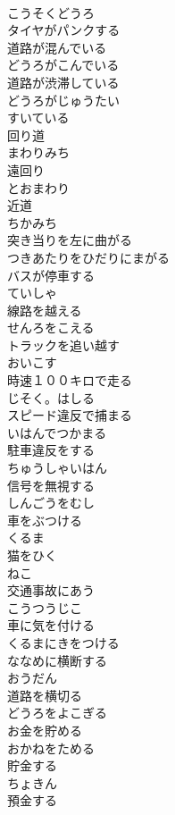 \documentclass[8pt]{extreport}
\begin{document}
\begin{CJK}{UTF8}{min}
\\	こうそくどうろ
\\	タイヤがパンクする	
\\	道路が混んでいる	
\\	どうろがこんでいる
\\	道路が渋滞している	
\\	どうろがじゅうたい
\\	すいている	
\\	回り道	
\\	まわりみち
\\	遠回り	
\\	とおまわり
\\	近道	
\\	ちかみち
\\	突き当りを左に曲がる	
\\	つきあたりをひだりにまがる
\\	バスが停車する	
\\	ていしゃ
\\	線路を越える	
\\	せんろをこえる
\\	トラックを追い越す	
\\	おいこす
\\	時速１００キロで走る	
\\	じそく。はしる
\\	スピード違反で捕まる	
\\	いはんでつかまる
\\	駐車違反をする	
\\	ちゅうしゃいはん
\\	信号を無視する	
\\	しんごうをむし
\\	車をぶつける	
\\	くるま
\\	猫をひく	
\\	ねこ
\\	交通事故にあう	
\\	こうつうじこ
\\	車に気を付ける	
\\	くるまにきをつける
\\	ななめに横断する	
\\	おうだん
\\	道路を横切る	
\\	どうろをよこぎる
\\	お金を貯める	
\\	おかねをためる
\\	貯金する	
\\	ちょきん
\\	預金する	

\end{CJK}
\end{document}

